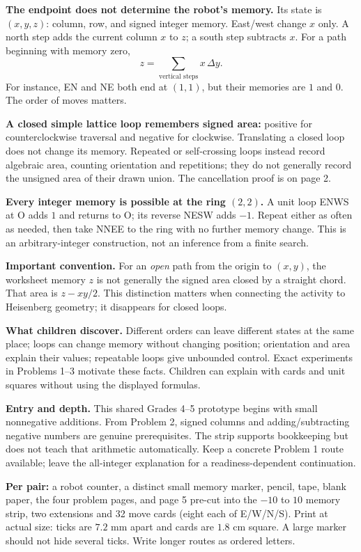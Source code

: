 \documentclass[11pt,letterpaper]{article}
\newcommand{\sectiontitle}[1]{\par\vspace{4pt}{\large\bfseries #1}\par}
\begin{document}
\sectiontitle{The mathematics first}
\textbf{The endpoint does not determine the robot's memory.} Its state is $(x,y,z)$: column, row, and signed integer memory. East/west change $x$ only. A north step adds the current column $x$ to $z$; a south step subtracts $x$. For a path beginning with memory zero,
\[
 z=\sum_{\text{vertical steps}}x\,\Delta y.
\]
For instance, EN and NE both end at $(1,1)$, but their memories are $1$ and $0$. The order of moves matters.

\textbf{A closed simple lattice loop remembers signed area:} positive for counterclockwise traversal and negative for clockwise. Translating a closed loop does not change its memory. Repeated or self-crossing loops instead record algebraic area, counting orientation and repetitions; they do not generally record the unsigned area of their drawn union. The cancellation proof is on page 2.

\textbf{Every integer memory is possible at the ring $(2,2)$.} A unit loop ENWS at O adds $1$ and returns to O; its reverse NESW adds $-1$. Repeat either as often as needed, then take NNEE to the ring with no further memory change. This is an arbitrary-integer construction, not an inference from a finite search.

\textbf{Important convention.} For an \emph{open} path from the origin to $(x,y)$, the worksheet memory $z$ is not generally the signed area closed by a straight chord. That area is $z-xy/2$. This distinction matters when connecting the activity to Heisenberg geometry; it disappears for closed loops.

\textbf{What children discover.} Different orders can leave different states at the same place; loops can change memory without changing position; orientation and area explain their values; repeatable loops give unbounded control. Exact experiments in Problems 1--3 motivate these facts. Children can explain with cards and unit squares without using the displayed formulas.

\textbf{Entry and depth.} This shared Grades 4--5 prototype begins with small nonnegative additions. From Problem 2, signed columns and adding/subtracting negative numbers are genuine prerequisites. The strip supports bookkeeping but does not teach that arithmetic automatically. Keep a concrete Problem 1 route available; leave the all-integer explanation for a readiness-dependent continuation.

\sectiontitle{Prepare and launch}
\textbf{Per pair:} a robot counter, a distinct small memory marker, pencil, tape, blank paper, the four problem pages, and page 5 pre-cut into the $-10$ to $10$ memory strip, two extensions and 32 move cards (eight each of E/W/N/S). Print at actual size: ticks are $7.2$ mm apart and cards are $1.8$ cm square. A large marker should not hide several ticks. Write longer routes as ordered letters.
\end{document}
